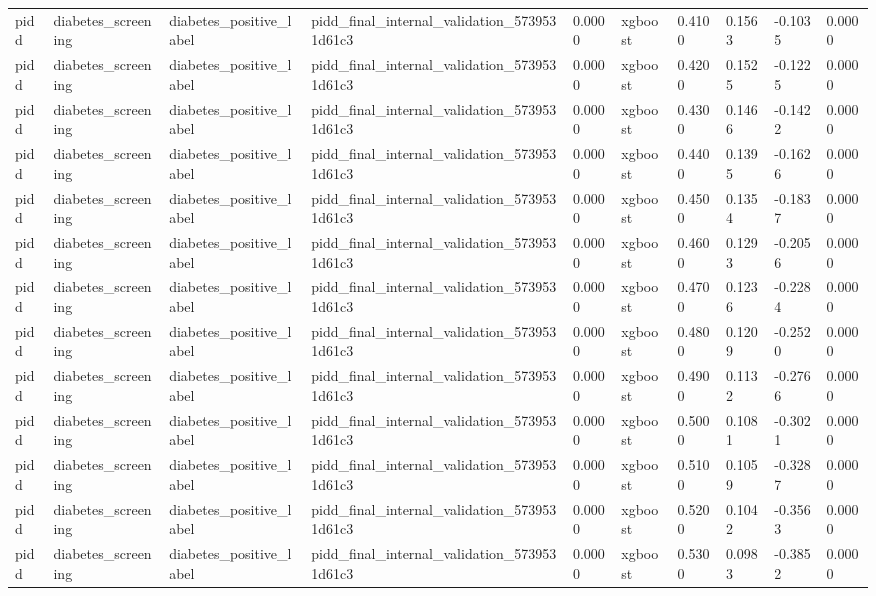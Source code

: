 \begin{tabular}{llllllllll}
pidd & diabetes\_screening & diabetes\_positive\_label & pidd\_final\_internal\_validation\_5739531d61c3 & 0.0000 & xgboost & 0.4100 & 0.1563 & -0.1035 & 0.0000 \\
pidd & diabetes\_screening & diabetes\_positive\_label & pidd\_final\_internal\_validation\_5739531d61c3 & 0.0000 & xgboost & 0.4200 & 0.1525 & -0.1225 & 0.0000 \\
pidd & diabetes\_screening & diabetes\_positive\_label & pidd\_final\_internal\_validation\_5739531d61c3 & 0.0000 & xgboost & 0.4300 & 0.1466 & -0.1422 & 0.0000 \\
pidd & diabetes\_screening & diabetes\_positive\_label & pidd\_final\_internal\_validation\_5739531d61c3 & 0.0000 & xgboost & 0.4400 & 0.1395 & -0.1626 & 0.0000 \\
pidd & diabetes\_screening & diabetes\_positive\_label & pidd\_final\_internal\_validation\_5739531d61c3 & 0.0000 & xgboost & 0.4500 & 0.1354 & -0.1837 & 0.0000 \\
pidd & diabetes\_screening & diabetes\_positive\_label & pidd\_final\_internal\_validation\_5739531d61c3 & 0.0000 & xgboost & 0.4600 & 0.1293 & -0.2056 & 0.0000 \\
pidd & diabetes\_screening & diabetes\_positive\_label & pidd\_final\_internal\_validation\_5739531d61c3 & 0.0000 & xgboost & 0.4700 & 0.1236 & -0.2284 & 0.0000 \\
pidd & diabetes\_screening & diabetes\_positive\_label & pidd\_final\_internal\_validation\_5739531d61c3 & 0.0000 & xgboost & 0.4800 & 0.1209 & -0.2520 & 0.0000 \\
pidd & diabetes\_screening & diabetes\_positive\_label & pidd\_final\_internal\_validation\_5739531d61c3 & 0.0000 & xgboost & 0.4900 & 0.1132 & -0.2766 & 0.0000 \\
pidd & diabetes\_screening & diabetes\_positive\_label & pidd\_final\_internal\_validation\_5739531d61c3 & 0.0000 & xgboost & 0.5000 & 0.1081 & -0.3021 & 0.0000 \\
pidd & diabetes\_screening & diabetes\_positive\_label & pidd\_final\_internal\_validation\_5739531d61c3 & 0.0000 & xgboost & 0.5100 & 0.1059 & -0.3287 & 0.0000 \\
pidd & diabetes\_screening & diabetes\_positive\_label & pidd\_final\_internal\_validation\_5739531d61c3 & 0.0000 & xgboost & 0.5200 & 0.1042 & -0.3563 & 0.0000 \\
pidd & diabetes\_screening & diabetes\_positive\_label & pidd\_final\_internal\_validation\_5739531d61c3 & 0.0000 & xgboost & 0.5300 & 0.0983 & -0.3852 & 0.0000 \\

\end{tabular}
